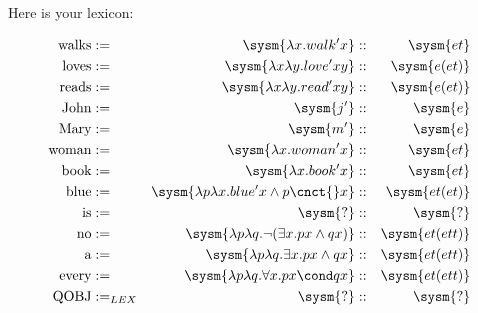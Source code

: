 \documentclass[10pt,a4paper]{exam}
\begin{document}


\vspace{10pt}

%

\vspace{90pt}


Here is your lexicon:


\begin{align*}
	\text{walks}   &:=& \sysm{\lambda x.walk'x}                          &::& \sysm{et}\\
	\text{loves}   &:=& \sysm{\lambda x\lambda y.love'xy}                &::& \sysm{e(et)}\\
	\text{reads}   &:=& \sysm{\lambda x\lambda y.read'xy}                &::& \sysm{e(et)}\\
	\text{John}    &:=& \sysm{j'}                                        &::& \sysm{e}\\
	\text{Mary}    &:=& \sysm{m'}                                        &::& \sysm{e}\\
	\text{woman}   &:=& \sysm{\lambda x.woman'x}                         &::& \sysm{et}\\
	\text{book}    &:=& \sysm{\lambda x.book'x}                          &::& \sysm{et}\\
	\text{blue}    &:=& \sysm{\lambda p\lambda x.blue'x\land p\cnct{}x}  &::& \sysm{et(et)}\\
	\text{is}      &:=& \sysm{?}                                         &::& \sysm{?}\\
	\text{no}      &:=& \sysm{\lambda p\lambda q.\neg(\exists x. px \land qx)} &::& \sysm{et(ett)}\\
	\text{a}       &:=& \sysm{\lambda p\lambda q.\exists x. px \land qx} &::& \sysm{et(ett)}\\
	\text{every}   &:=& \sysm{\lambda p\lambda q.\forall x. px \cond qx} &::& \sysm{et(ett)}\\
	\text{QOBJ}    &:=_{LEX}& \sysm{?} &::& \sysm{?}
\end{align*}
\end{document}
